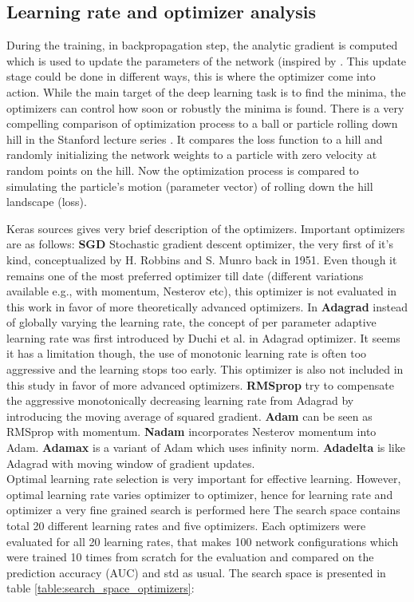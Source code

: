 \subsection{Learning rate and optimizer analysis}

During the training, in backpropagation step, the analytic gradient is computed which is used to update the parameters of the network (inspired by \cite{ruder}. This update stage could be done in different ways, 
this is where the optimizer come into action. While the main target of the deep learning task is to find the minima, the optimizers can control how soon or robustly the minima is found. There is a very compelling 
comparison of optimization process to a ball or particle rolling down hill in the Stanford lecture series \cite{cs231n}. It compares the loss function to a hill and randomly initializing the network weights to a particle with 
zero velocity at random points on the hill. Now the optimization process is compared to simulating the particle's motion (parameter vector) of rolling down the hill landscape (loss).

Keras sources \cite{kerasopt} gives very brief description of the optimizers. Important optimizers are as follows: \textbf{SGD} Stochastic gradient descent optimizer, the very first of it's kind, conceptualized by H. 
Robbins and S. Munro back in 1951. Even though it remains one of the most preferred optimizer till date 
(different variations available e.g., with momentum, Nesterov etc), this optimizer is not evaluated in this work in favor of more theoretically advanced optimizers. In \textbf{Adagrad} instead of globally varying the learning rate, 
the concept of per parameter adaptive learning rate was first introduced by Duchi et al. in Adagrad optimizer. It seems it has a limitation though, the use of monotonic learning rate is often too aggressive and the 
learning stops too early. This optimizer is also not included in this study in favor of more advanced optimizers. \textbf{RMSprop} try to compensate the aggressive monotonically decreasing learning rate from 
Adagrad by introducing the moving average of squared gradient. \textbf{Adam} can be seen as RMSprop with momentum. \textbf{Nadam} incorporates Nesterov momentum into Adam. \textbf{Adamax} is a variant 
of Adam which uses infinity norm. \textbf{Adadelta} is like Adagrad with moving window of gradient updates.\\

Optimal learning rate selection is very important for effective learning. However, optimal learning rate varies optimizer to optimizer, hence for learning rate and optimizer a very fine grained search is performed here
The search space contains total 20 different learning rates and five optimizers. Each optimizers were evaluated for all 20 learning rates, that makes 100 network configurations which were trained 10 times from scratch 
for the evaluation and compared on the prediction accuracy (AUC) and std as usual. The search space is presented in table \ref{table:search_space_optimizers}:

